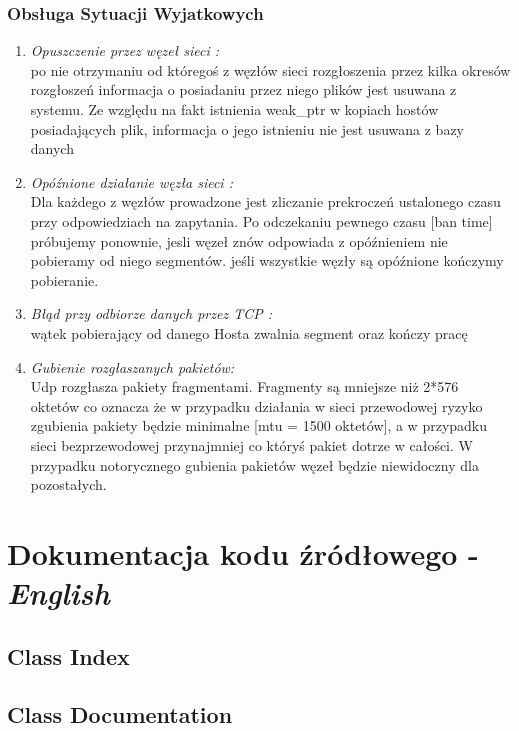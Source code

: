 \documentclass[11pt,oneside]{book}
\newcommand{\+}{\discretionary{\mbox{\scriptsize$\hookleftarrow$}}{}{}}
\begin{document}
\section{Obsługa Sytuacji Wyjatkowych}
\begin{enumerate}
	\item 
	\textit{Opuszczenie przez węzeł sieci :} \\
	po nie otrzymaniu od któregoś z węzłów sieci rozgłoszenia przez kilka okresów rozgłoszeń informacja o posiadaniu przez niego plików jest usuwana z systemu. Ze względu na fakt istnienia weak\_ptr  w kopiach hostów posiadających plik, informacja o jego istnieniu nie jest usuwana z bazy danych
	\item
\textit{	Opóźnione działanie węzła sieci :}\\
	Dla każdego z węzłów prowadzone jest zliczanie prekroczeń ustalonego czasu przy odpowiedziach na zapytania. Po odczekaniu pewnego czasu [ban time] próbujemy ponownie, jesli węzeł znów odpowiada z opóźnieniem nie pobieramy od niego segmentów.
	jeśli wszystkie węzły są opóźnione kończymy pobieranie.
	\item
	\textit{Błąd przy odbiorze danych przez TCP :}\\
	wątek pobierający od danego Hosta zwalnia segment oraz kończy pracę
	\item
\textit{	Gubienie rozgłaszanych pakietów: }\\
	 Udp rozgłasza pakiety fragmentami. Fragmenty są mniejsze niż 2*576 oktetów co oznacza że w przypadku działania w sieci przewodowej ryzyko zgubienia pakiety będzie minimalne [mtu = 1500 oktetów], a w przypadku sieci bezprzewodowej przynajmniej co któryś pakiet dotrze w całości. W przypadku notorycznego gubienia pakietów węzeł będzie niewidoczny dla pozostałych.
	
\end{enumerate}

\part{Dokumentacja kodu źródłowego - \textit{English}}
\chapter{Class Index}

\chapter{Class Documentation}


















\end{document}

